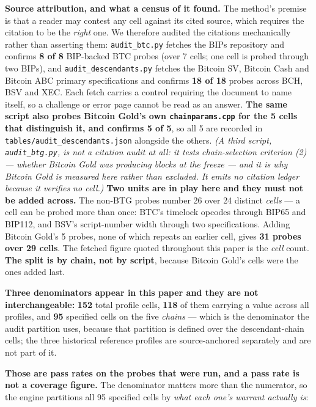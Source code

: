 \documentclass[
]{article}
\newcounter{none} %
\begin{document}
\textbf{Source attribution, and what a census of it found.} The method's
premise is that a reader may contest any cell against its cited source,
which requires the citation to be the \emph{right} one. We therefore
audited the citations mechanically rather than asserting them:
\texttt{audit\_btc.py} fetches the BIPs repository and confirms
\textbf{8 of 8} BIP-backed BTC probes (over 7 cells; one cell is probed
through two BIPs), and \texttt{audit\_descendants.py} fetches the
Bitcoin SV, Bitcoin Cash and Bitcoin ABC primary specifications and
confirms \textbf{18 of 18} probes across BCH, BSV and XEC. Each fetch
carries a control requiring the document to name itself, so a challenge
or error page cannot be read as an answer. \textbf{The same script also
probes Bitcoin Gold's own \texttt{chainparams.cpp} for the 5 cells that
distinguish it, and confirms 5 of 5}, so all 5 are recorded in
\texttt{tables/audit\_descendants.json} alongside the others. \emph{(A
third script, \texttt{audit\_btg.py}, is not a citation audit at all: it
tests chain-selection criterion (2) --- whether Bitcoin Gold was
producing blocks at the freeze --- and it is why Bitcoin Gold is
measured here rather than excluded. It emits no citation ledger because
it verifies no cell.)} \textbf{Two units are in play here and they must
not be added across.} The non-BTG probes number 26 over 24 distinct
\emph{cells} --- a cell can be probed more than once: BTC's timelock
opcodes through BIP65 and BIP112, and BSV's script-number width through
two specifications. Adding Bitcoin Gold's 5 probes, none of which
repeats an earlier cell, gives \textbf{31 probes over 29 cells}. The
fetched figure quoted throughout this paper is the \emph{cell} count.
\textbf{The split is by chain, not by script}, because Bitcoin Gold's
cells were the ones added last.

\textbf{Three denominators appear in this paper and they are not
interchangeable:} \textbf{152} total profile cells, \textbf{118} of them
carrying a value across all profiles, and \textbf{95} specified cells on
the five \emph{chains} --- which is the denominator the audit partition
uses, because that partition is defined over the descendant-chain cells;
the three historical reference profiles are source-anchored separately
and are not part of it.

\textbf{Those are pass rates on the probes that were run, and a pass
rate is not a coverage figure.} The denominator matters more than the
numerator, so the engine partitions all 95 specified cells by \emph{what
each one's warrant actually is}:
\end{document}
